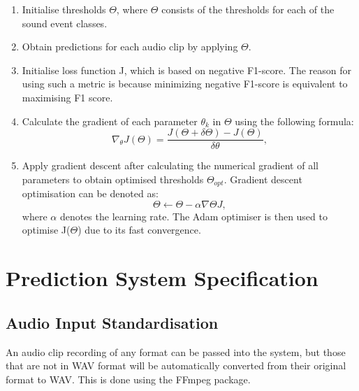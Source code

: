 \begin{enumerate}
    \item Initialise thresholds \(\Theta\), where \(\Theta\) consists of the thresholds for each of the sound event classes.
    \item Obtain predictions for each audio clip by applying \(\Theta\).
    \item Initialise loss function J, which is based on negative F1-score. The reason for using such a metric is because minimizing negative F1-score is equivalent to maximising F1 score.
    \item Calculate the gradient of each parameter \(\theta_k\) in \(\Theta\) using the following formula:
    \begin{equation}
    \nabla_\theta J(\Theta) = \frac{J(\Theta + \delta\Theta) - J(\Theta)}{\delta\theta} ,    
    \end{equation}
    \item Apply gradient descent \cite{ruder2016overview} after calculating the numerical gradient of all parameters to obtain optimised thresholds \(\Theta_{opt}\). Gradient descent optimisation can be denoted as:
    \begin{equation}
    \Theta \leftarrow \Theta - \alpha \nabla\Theta J ,
    \end{equation}
    where \(\alpha\) denotes the learning rate.
    The Adam optimiser \cite{kingma2017adam} is then used to optimise J(\(\Theta\)) due to its fast convergence.
\end{enumerate}


\section{Prediction System Specification}

\subsection{Audio Input Standardisation}
An audio clip recording of any format can be passed into the system, but those that are not in WAV format will be automatically converted from their original format to WAV. This is done using the FFmpeg package.

